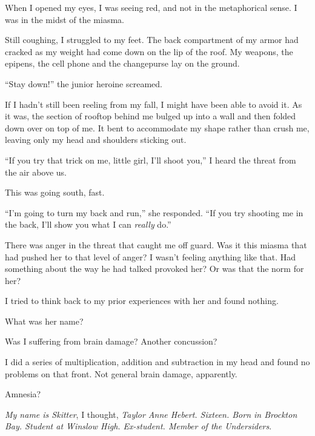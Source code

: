 When I opened my eyes, I was seeing red, and not in the metaphorical sense.  I was in the midst of the miasma.



Still coughing, I struggled to my feet.  The back compartment of my armor had cracked as my weight had come down on the lip of the roof.  My weapons, the epipens, the cell phone and the changepurse lay on the ground.



``Stay down!''  the junior heroine screamed.



If I hadn't still been reeling from my fall, I might have been able to avoid it.  As it was, the section of rooftop behind me bulged up into a wall and then folded down over on top of me.  It bent to accommodate my shape rather than crush me, leaving only my head and shoulders sticking out.



``If you try that trick on me, little girl, I'll shoot you,'' I heard the threat from the air above us.



This was going south, fast.



``I'm going to turn my back and run,'' she responded.  ``If you try shooting me in the back, I'll show you what I can \emph{really} do.''



There was anger in the threat that caught me off guard.  Was it this miasma that had pushed her to that level of anger?  I wasn't feeling anything like that.  Had something about the way he had talked provoked her?  Or was that the norm for her?



I tried to think back to my prior experiences with her and found nothing.



What was her name?



Was I suffering from brain damage?  Another concussion?



I did a series of multiplication, addition and subtraction in my head and found no problems on that front.  Not general brain damage, apparently.



Amnesia?



\emph{My name is Skitter}, I thought, \emph{Taylor Anne Hebert.  Sixteen.  Born in Brockton Bay.  Student at Winslow High.  Ex-student.  Member of the Undersiders}.



